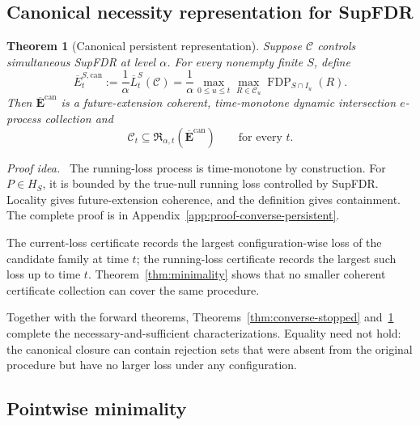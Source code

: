\documentclass[11pt]{article}
\numberwithin{equation}{section}
\theoremstyle{plain}
\newtheorem{theorem}{Theorem}[section]
\theoremstyle{definition}
\newcommand{\C}{\mathcal C}
\newcommand{\Rfam}{\mathfrak R}
\newcommand{\FDP}{\operatorname{FDP}}
\newcommand{\runloss}{\overline L}
\newcommand{\can}{\mathrm{can}}
\newcommand{\proofidea}{\par\medskip\noindent\textit{Proof idea.}\ }
\begin{document}
\subsection{Canonical necessity representation for SupFDR}

\begin{theorem}[Canonical persistent representation]\label{thm:converse-persistent}
Suppose $\C$ controls simultaneous SupFDR at level $\alpha$. For every nonempty finite $S$, define
\begin{equation}\label{eq:canonical-running}
  \overline E_t^{S,\can}
  :=\frac1\alpha\runloss_t^S(\C)
  =\frac1\alpha\max_{0\leq u\leq t}\max_{R\in\C_u}
  \FDP_{S\cap I_u}(R).
\end{equation}
Then $\overline{\mathbf E}^{\can}$ is a future-extension coherent, time-monotone dynamic intersection $e$-process collection and
\begin{equation}\label{eq:running-containment}
  \C_t\subseteq\Rfam_{\alpha,t}(\overline{\mathbf E}^{\can})
  \qquad\text{for every }t.
\end{equation}
\end{theorem}

\proofidea
The running-loss process is time-monotone by construction. For $P\in H_S$, it is bounded by the true-null running loss controlled by SupFDR. Locality gives future-extension coherence, and the definition gives containment. The complete proof is in Appendix~\ref{app:proof-converse-persistent}.

The current-loss certificate records the largest configuration-wise loss of the candidate family at time $t$; the running-loss certificate records the largest such loss up to time $t$. Theorem~\ref{thm:minimality} shows that no smaller coherent certificate collection can cover the same procedure.

Together with the forward theorems, Theorems~\ref{thm:converse-stopped} and~\ref{thm:converse-persistent} complete the necessary-and-sufficient characterizations. Equality need not hold: the canonical closure can contain rejection sets that were absent from the original procedure but have no larger loss under any configuration.

\subsection{Pointwise minimality}\label{sec:minimality}
\end{document}

